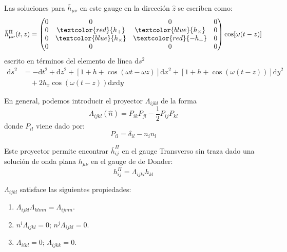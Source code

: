 \documentclass[../main]{subfiles}
\begin{document}
\begin{adjustwidth}{0pt}{-100pt}
Las soluciones para $\bar{h}_{\mu\nu}$ en este gauge en la dirección $\hat{z}$ se escriben como:
\begin{equation}
    \bar{h}^{\Pi}_{\mu\nu}(t, z)=
    \begin{pmatrix}
        0 & 0 & 0 & 0 \\
        0 & \textcolor{red}{h_+} & \textcolor{blue}{h_{\times}} & 0 \\
        0 & \textcolor{blue}{h_\times}& \textcolor{red}{-h_+} &  0\\
        0 & 0 & 0 & 0
    \end{pmatrix}
    \cos[\omega(t-z)]
\end{equation}
escrito en términos del elemento de línea $\mathrm{d}s^2$
\begin{equation}
    \begin{split}
        \mathrm{d}s^2&=-\mathrm{d}t^2+\mathrm{d}z^2+\left[1+h+\cos(\omega t-\omega z)\right]\mathrm{d}x^2+\left[1+h+\cos(\omega(t-z))\right]\mathrm{d}y^2\\
        &\quad +2h_x\cos(\omega(t-z))\mathrm{d}x\mathrm{d}y 
    \end{split}
\end{equation}

En general, podemos introducir el proyector $\Lambda_{ijkl}$ de la forma 
\begin{equation}
    \Lambda_{ijkl}(\hat{n})=P_{ik}P_{jl}-\dfrac{1}{2}P_{ij}P_{kl}
\end{equation}
donde $P_{il}$ viene dado por:
\begin{equation}
    P_{il}=\delta_{il}-n_i n_l
\end{equation}

Este proyector permite encontrar $\bar{h}^{\Pi}_{ij}$ en el gauge Transverso sin traza dado una solución de onda plana $h_{\mu\nu}$ en el gauge de de Donder:
\begin{equation}
    h^{\Pi}_{ij}=\Lambda_{ijkl}h_{kl}
\end{equation}

$\Lambda_{ijkl}$ satisface las siguientes propiedades:
\begin{enumerate}
    \item $\Lambda_{ijkl}\Lambda_{klmn}=\Lambda_{ijmn}$.
    \item $n^{i}\Lambda_{ijkl}=0$; $n^{j}\Lambda_{ijkl}=0$.
    \item $\Lambda_{iikl}=0$; $\Lambda_{ijkk}=0$.
\end{enumerate}


\end{adjustwidth}
\end{document}
